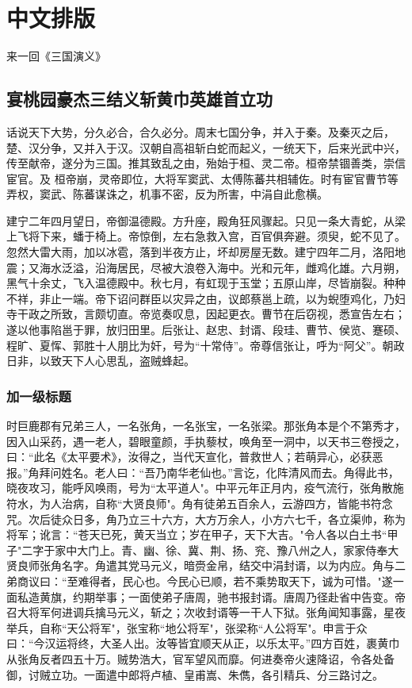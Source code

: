 \documentclass[UTF8,a4paper,twoside,zihao=-4]{ctexrep}
\begin{document}


\tableofcontents\newpage\mbox{}\thispagestyle{empty}\newpage
\clearpage{}
\chapter{中文排版}
来一回《三国演义》
\section{宴桃园豪杰三结义\quad 斩黄巾英雄首立功}
话说天下大势，分久必合，合久必分。周末七国分争，并入于秦。及秦灭之后，楚、汉分争，又并入于汉。汉朝自高祖斩白蛇而起义，一统天下，后来光武中兴，传至献帝，遂分为三国。推其致乱之由，殆始于桓、灵二帝。桓帝禁锢善类，崇信宦官。及
桓帝崩，灵帝即位，大将军窦武、太傅陈蕃共相辅佐。时有宦官曹节等弄权，窦武、陈蕃谋诛之，机事不密，反为所害，中涓自此愈横。

建宁二年四月望日，帝御温德殿。方升座，殿角狂风骤起。只见一条大青蛇，从梁上飞将下来，蟠于椅上。帝惊倒，左右急救入宫，百官俱奔避。须臾，蛇不见了。忽然大雷大雨，加以冰雹，落到半夜方止，坏却房屋无数。建宁四年二月，洛阳地震；又海水泛溢，沿海居民，尽被大浪卷入海中。光和元年，雌鸡化雄。六月朔，黑气十余丈，飞入温德殿中。秋七月，有虹现于玉堂；五原山岸，尽皆崩裂。种种不祥，非止一端。帝下诏问群臣以灾异之由，议郎蔡邕上疏，以为蜺堕鸡化，乃妇寺干政之所致，言颇切直。帝览奏叹息，因起更衣。曹节在后窃视，悉宣告左右；遂以他事陷邕于罪，放归田里。后张让、赵忠、封谞、段珪、曹节、侯览、蹇硕、程旷、夏恽、郭胜十人朋比为奸，号为``十常侍''。帝尊信张让，呼为``阿父''。朝政日非，以致天下人心思乱，盗贼蜂起。
\subsection{加一级标题}

时巨鹿郡有兄弟三人，一名张角，一名张宝，一名张梁。那张角本是个不第秀才，因入山采药，遇一老人，碧眼童颜，手执藜杖，唤角至一洞中，以天书三卷授之，曰：``此名《太平要术》，汝得之，当代天宣化，普救世人；若萌异心，必获恶报。''角拜问姓名。老人曰：``吾乃南华老仙也。''言讫，化阵清风而去。角得此书，晓夜攻习，能呼风唤雨，号为``太平道人"。中平元年正月内，疫气流行，张角散施符水，为人治病，自称``大贤良师"。角有徒弟五百余人，云游四方，皆能书符念咒。次后徒众日多，角乃立三十六方，大方万余人，小方六七千，各立渠帅，称为将军；讹言：``苍天已死，黄天当立；岁在甲子，天下大吉。"令人各以白土书``甲子"二字于家中大门上。青、幽、徐、冀、荆、扬、兖、豫八州之人，家家侍奉大贤良师张角名字。角遣其党马元义，暗赍金帛，结交中涓封谞，以为内应。角与二弟商议曰：``至难得者，民心也。今民心已顺，若不乘势取天下，诚为可惜。"遂一面私造黄旗，约期举事；一面使弟子唐周，驰书报封谞。唐周乃径赴省中告变。帝召大将军何进调兵擒马元义，斩之；次收封谞等一干人下狱。张角闻知事露，星夜举兵，自称``天公将军"，张宝称``地公将军"，张梁称``人公将军"。申言于众曰：``今汉运将终，大圣人出。汝等皆宜顺天从正，以乐太平。''四方百姓，裹黄巾从张角反者四五十万。贼势浩大，官军望风而靡。何进奏帝火速降诏，令各处备御，讨贼立功。一面遣中郎将卢植、皇甫嵩、朱儁，各引精兵、分三路讨之。
\end{document}
